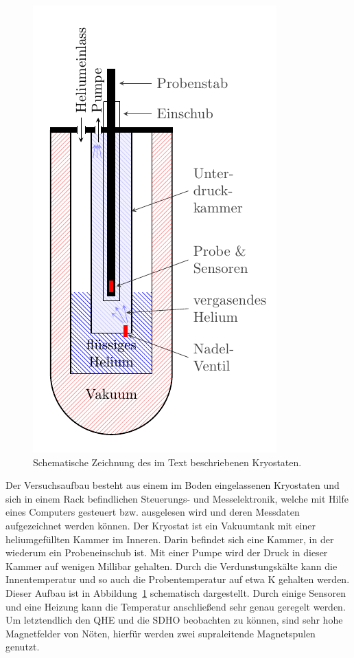 \begin{figure}
		\centering
		\includegraphics[scale=1]{graphs/aufbau/tank.pdf}
		\caption[Schematischer Aufbau des Kryostaten]{Schematische Zeichnung des im Text beschriebenen Kryostaten.}
		\label{fig:kryo}
\end{figure}

Der Versuchsaufbau besteht aus einem im Boden eingelassenen Kryostaten und sich in einem Rack befindlichen Steuerungs- und Messelektronik, welche mit Hilfe eines Computers gesteuert bzw. ausgelesen wird und deren Messdaten aufgezeichnet werden können. Der Kryostat ist ein Vakuumtank mit einer heliumgefüllten Kammer im Inneren. Darin befindet sich eine Kammer, in der wiederum ein Probeneinschub ist. Mit einer Pumpe wird der Druck in dieser Kammer auf wenigen Millibar gehalten. Durch die Verdunstungskälte kann die Innentemperatur und so auch die Probentemperatur auf etwa \unit[1,5]{K} gehalten werden. Dieser Aufbau ist in Abbildung~\ref{fig:kryo} schematisch dargestellt. Durch einige Sensoren und eine Heizung kann die Temperatur anschließend sehr genau geregelt werden. Um letztendlich den QHE und die SDHO beobachten zu können, sind sehr hohe Magnetfelder von Nöten, hierfür werden zwei supraleitende Magnetspulen genutzt.\\

